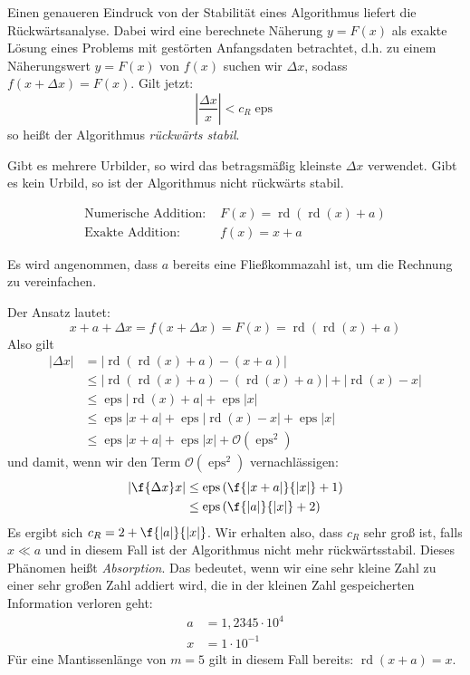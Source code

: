 \documentclass{mycourse}
\DeclareMathOperator{\rd}{rd}
\renewcommand{\eps}{\operatorname{eps}}
\begin{document}
Einen genaueren Eindruck von der Stabilität eines Algorithmus liefert die Rückwärtsanalyse.
Dabei wird eine berechnete Näherung $y=F(x)$ als exakte Lösung eines Problems mit gestörten Anfangsdaten betrachtet,
d.h. zu einem Näherungswert $y=F(x)$ von $f(x)$ suchen wir $\Delta x$, sodass $f(x+\Delta x)=F(x)$.
Gilt jetzt:
\[
\left|\frac{\Delta x}x\right| < c_R \eps
\]
so heißt der Algorithmus \emph{rückwärts stabil}.

Gibt es mehrere Urbilder, so wird das betragsmäßig kleinste $\Delta x$ verwendet.
Gibt es kein Urbild, so ist der Algorithmus nicht rückwärts stabil.

\begin{ex}
\label{ex:2.6}
\begin{align*}
\text{Numerische Addition: } &F(x)=\rd(\rd(x)+a)\\
\text{Exakte Addition: } &f(x)=x+a
\end{align*}
\begin{note}
Es wird angenommen, dass $a$ bereits eine Fließkommazahl ist, um die Rechnung zu vereinfachen.
\end{note}
Der Ansatz lautet:
\[
	x+a+\Delta x = f(x+\Delta x) = F(x) = \rd(\rd(x)+a)
\]
Also gilt
\begin{align*}
	|\Delta x| &= |\rd(\rd(x)+a)-(x+a)|\\
				  &\le |\rd(\rd(x)+a) - (\rd(x)+a)| + |\rd(x)-x|\\
		&\le \eps|\rd(x) +a| + \eps|x|\\
		&\le \eps|x+a| + \eps|\rd(x)-x| + \eps|x|\\
		&\le \eps|x+a| + \eps|x| + \mathcal O(\eps^2)
\end{align*}
und damit, wenn wir den Term $\mathcal O(\eps^2)$ vernachlässigen:
\begin{align*}
	\left| \f{\Delta x}x\right| &\le \eps\left(\f{|x+a|}{|x|}+1\right)\\
		&\le \eps\left(\f{|a|}{|x|} + 2\right)
\end{align*}
Es ergibt sich $c_R = 2+\f{|a|}{|x|}$.
Wir erhalten also, dass $c_R$ sehr groß ist, falls $x\ll a$ und in diesem Fall ist der Algorithmus nicht mehr rückwärtsstabil.
Dieses Phänomen heißt \emph{Absorption}.
Das bedeutet, wenn wir eine sehr kleine Zahl zu einer sehr großen Zahl addiert wird, die in der kleinen Zahl gespeicherten Information verloren geht:
\begin{align*}
a&=1,2345\cdot 10^4\\
x&=1\cdot 10^{-1}
\end{align*}
Für eine Mantissenlänge von $m=5$ gilt in diesem Fall bereits: $\rd(x+a)=x$.
\end{ex}
\end{document}
